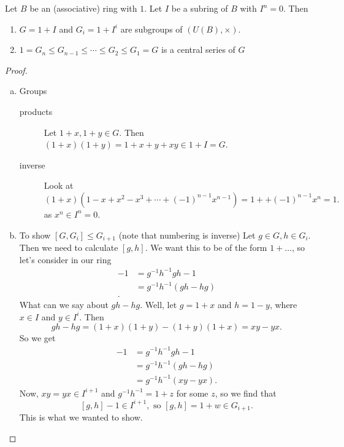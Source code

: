 \begin{prop}
    Let $B$ be an (associative) ring with $1$.
    Let $I$ be a subring of $B$ with $I^{n}=0$.
    Then 
    \begin{enumerate}[(1)]
        \item $G = 1 + I$ and  $G_i = 1 + I^{i}$ are subgroups of $(U(B), \times )$.
        \item $1 = G_n \le  G_{n-1} \le  \cdots \le  G_2 \le G_1 = G$ is a central series of $G$
    \end{enumerate}
\end{prop}
\begin{proof}
    \begin{enumerate}[(a)]
        \item Groups
\begin{description}
        \item[products]
    Let $1 +x, 1 + y \in G$.
    Then $(1+x)(1+y) = 1 + x + y + xy  \in 1 + I = G$.
            \item[inverse]
    Look at 
    \[
        (1+x)(1 - x + x^2 - x^3 + \cdots + (-1)^{n-1} x^{n-1}) = 1 + + (-1)^{n-1}x^{n}  = 1
    .\] 
    as $x^{n} \in I^{n} = 0$.
    \end{description}
\item To show $[G, G_i] \le G_{i+1}$ (note that numbering is inverse)
    Let $g \in G, h \in G_i$.
    Then we need to calculate $[g, h]$.
    We want this to be of the form  $1 + \ldots$, so let's consider in our ring
    \begin{align*}
        [g, h] - 1 &= g^{-1} h^{-1} g h - 1\\
                   &= g^{-1}h^{-1}(gh - hg)\\
    .\end{align*} 
    What can we say about $gh - hg$.
    Well, let  $g = 1 + x$ and  $h = 1 - y$, where $x \in I$ and $y \in I^{i}$.
    Then
    \[
        gh - hg = (1+x)(1+y) - (1+y) (1+x) = xy -  yx
    .\] 
    So we get
    \begin{align*}
        [g, h] - 1 &= g^{-1} h^{-1} g h - 1\\
                   &= g^{-1}h^{-1}(gh - hg)\\
                   &= g^{-1} h^{-1}(xy - yx)
    .\end{align*} 
    Now, $xy = yx \in I^{i + 1}$ and $g ^{-1}h^{-1} = 1 + z$ for some $z$, so we find that
    \[
        [g, h] -1 \in I^{i+1}, \text{ so  } [g, h] = 1 + w \in G_{i+1}
    .\] 
    This is what we wanted to show.
    \end{enumerate}
    
\end{proof}

